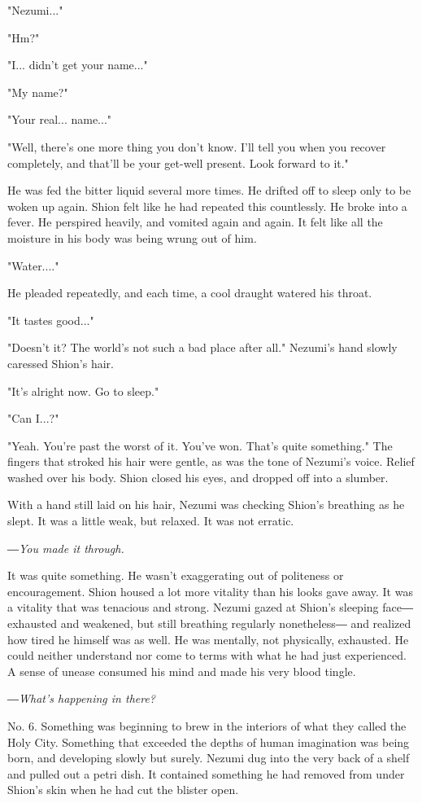 "Nezumi..."

"Hm?"

"I... didn't get your name..."

"My name?"

"Your real... name..."

"Well, there's one more thing you don't know. I'll tell you when you
recover completely, and that'll be your get-well present. Look forward
to it."

He was fed the bitter liquid several more times. He drifted off to sleep
only to be woken up again. Shion felt like he had repeated this
countlessly. He broke into a fever. He perspired heavily, and vomited
again and again. It felt like all the moisture in his body was being
wrung out of him.

"Water...."

He pleaded repeatedly, and each time, a cool draught watered his throat.

"It tastes good..."

"Doesn't it? The world's not such a bad place after all." Nezumi's hand
slowly caressed Shion's hair.

"It's alright now. Go to sleep."

"Can I...?"

"Yeah. You're past the worst of it. You've won. That's quite something."
The fingers that stroked his hair were gentle, as was the tone of
Nezumi's voice. Relief washed over his body. Shion closed his eyes, and
dropped off into a slumber.

\mybreak

With a hand still laid on his hair, Nezumi was checking Shion's
breathing as he slept. It was a little weak, but relaxed. It was not
erratic.

\emph{―You made it through.}

It was quite something. He wasn't exaggerating out of politeness or
encouragement. Shion housed a lot more vitality than his looks gave
away. It was a vitality that was tenacious and strong. Nezumi gazed at
Shion's sleeping face― exhausted and weakened, but still breathing
regularly nonetheless― and realized how tired he himself was as well. He
was mentally, not physically, exhausted. He could neither understand nor
come to terms with what he had just experienced. A sense of unease
consumed his mind and made his very blood tingle.

\emph{―What's happening in there?}

No. 6. Something was beginning to brew in the interiors of what they
called the Holy City. Something that exceeded the depths of human
imagination was being born, and developing slowly but surely. Nezumi dug
into the very back of a shelf and pulled out a petri dish. It contained
something he had removed from under Shion's skin when he had cut the
blister open.

